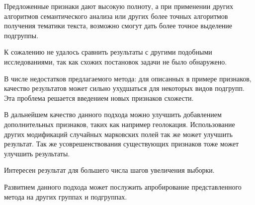 \documentclass[annotation,times,page4]{itmo-student-thesis}
\begin{document}
Предложенные признаки дают высокую полноту, а при применении других алгоритмов семантического анализа или других более точных алгоритмов получения тематики текста, возможно смогут дать более точное выделение подгруппы.

К сожалению не удалось сравнить результаты с другими подобными исследованиями, так как схожих постановок задачи не было обнаружено.

В числе недостатков предлагаемого метода: для описанных в примере признаков, качество результатов может сильно ухудшаться для некоторых видов подгрупп. Эта проблема решается введением новых признаков схожести.

В дальнейшем качество данного подхода можно улучшить добавлением дополнительных признаков, таких как например геолокация. Использование других модификаций случайных марковских полей так же может улучшить результат. Так же усоврешенствования существующих признаков тоже может улучшить результаты.

Интересен результат для большего числа шагов увеличения выборки.

Развитием данного подхода может послужить апробирование представленного метода на других группах и подгруппах.

\printbibliography[heading=trueHeading]

\appendix
\end{document}
